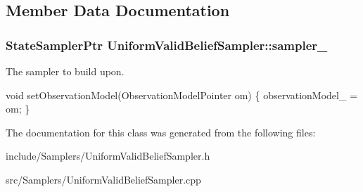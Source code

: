 \subsection{\-Member \-Data \-Documentation}
\hypertarget{class_uniform_valid_belief_sampler_a1d133b2161245e32544833d5be54e595}{
\subsubsection[{sampler\-\_\-}]{\setlength{\rightskip}{0pt plus 5cm}\-State\-Sampler\-Ptr {\bf \-Uniform\-Valid\-Belief\-Sampler\-::sampler\-\_\-}}}\label{class_uniform_valid_belief_sampler_a1d133b2161245e32544833d5be54e595}


\-The sampler to build upon. 

void set\-Observation\-Model(\-Observation\-Model\-Pointer om) \{ observation\-Model\-\_\- = om; \} 

\-The documentation for this class was generated from the following files\-:\begin{DoxyCompactItemize}
\item 
include/\-Samplers/\-Uniform\-Valid\-Belief\-Sampler.\-h\item 
src/\-Samplers/\-Uniform\-Valid\-Belief\-Sampler.\-cpp\end{DoxyCompactItemize}
